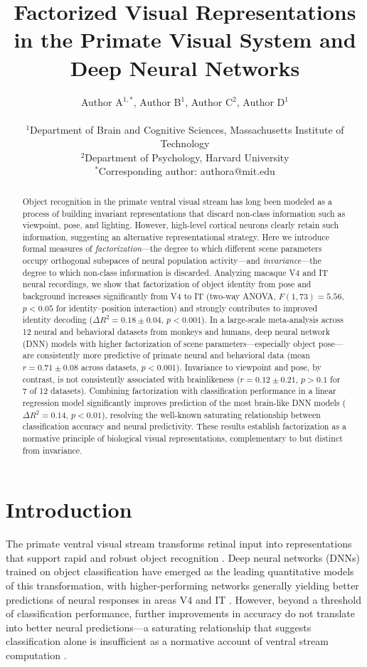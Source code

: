 \documentclass[11pt]{article}
\title{Factorized Visual Representations in the Primate Visual System and Deep Neural Networks}
\author{
Author A$^{1,*}$, Author B$^{1}$, Author C$^{2}$, Author D$^{1}$ \\
\\
$^{1}$Department of Brain and Cognitive Sciences, Massachusetts Institute of Technology \\
$^{2}$Department of Psychology, Harvard University \\
$^{*}$Corresponding author: authora@mit.edu
}
\date{}
\begin{document}
\maketitle

\begin{abstract}
Object recognition in the primate ventral visual stream has long been modeled as a process of building invariant representations that discard non-class information such as viewpoint, pose, and lighting. However, high-level cortical neurons clearly retain such information, suggesting an alternative representational strategy. Here we introduce formal measures of \textit{factorization}---the degree to which different scene parameters occupy orthogonal subspaces of neural population activity---and \textit{invariance}---the degree to which non-class information is discarded. Analyzing macaque V4 and IT neural recordings, we show that factorization of object identity from pose and background increases significantly from V4 to IT (two-way ANOVA, $F(1,73) = 5.56$, $p < 0.05$ for identity--position interaction) and strongly contributes to improved identity decoding ($\Delta R^2 = 0.18 \pm 0.04$, $p < 0.001$). In a large-scale meta-analysis across 12 neural and behavioral datasets from monkeys and humans, deep neural network (DNN) models with higher factorization of scene parameters---especially object pose---are consistently more predictive of primate neural and behavioral data (mean $r = 0.71 \pm 0.08$ across datasets, $p < 0.001$). Invariance to viewpoint and pose, by contrast, is not consistently associated with brainlikeness ($r = 0.12 \pm 0.21$, $p > 0.1$ for 7 of 12 datasets). Combining factorization with classification performance in a linear regression model significantly improves prediction of the most brain-like DNN models ($\Delta R^2 = 0.14$, $p < 0.01$), resolving the well-known saturating relationship between classification accuracy and neural predictivity. These results establish factorization as a normative principle of biological visual representations, complementary to but distinct from invariance.
\end{abstract}

\section{Introduction}

The primate ventral visual stream transforms retinal input into representations that support rapid and robust object recognition \citep{dicarlo2012does}. Deep neural networks (DNNs) trained on object classification have emerged as the leading quantitative models of this transformation, with higher-performing networks generally yielding better predictions of neural responses in areas V4 and IT \citep{yamins2014performance, khalighrazavi2014deep, gucclu2015deep}. However, beyond a threshold of classification performance, further improvements in accuracy do not translate into better neural predictions---a saturating relationship that suggests classification alone is insufficient as a normative account of ventral stream computation \citep{schrimpf2018brain, conwell2023can}.
\end{document}
